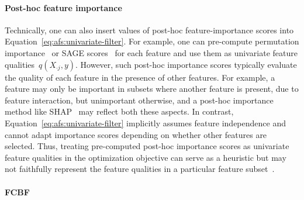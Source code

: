 \documentclass{article}
\theoremstyle{definition}
\begin{document}
\paragraph{Post-hoc feature importance}

Technically, one can also insert values of post-hoc feature-importance scores into Equation~\ref{eq:afs:univariate-filter}.
For example, one can pre-compute permutation importance~\cite{breiman2001random} or SAGE scores~\cite{covert2020understanding} for each feature and use them as univariate feature qualities~$q(X_{\cdot{}j},y)$.
However, such post-hoc importance scores typically evaluate the quality of each feature in the presence of other features. 
For example, a feature may only be important in subsets where another feature is present, due to feature interaction, but unimportant otherwise, and a post-hoc importance method like SHAP~\cite{lundberg2017unified} may reflect both these aspects.
In contrast, Equation~\ref{eq:afs:univariate-filter} implicitly assumes feature independence and cannot adapt importance scores depending on whether other features are selected.
Thus, treating pre-computed post-hoc importance scores as univariate feature qualities in the optimization objective can serve as a heuristic but may not faithfully represent the feature qualities in a particular feature subset~\cite{fryer2021shapley}.

\paragraph{FCBF}
\end{document}
